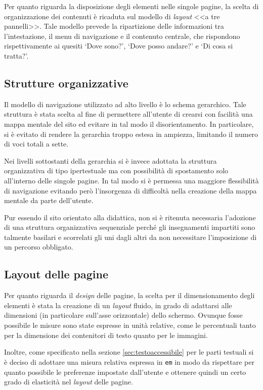 \documentclass[10pt,a4paper,onecolumn]{article}
\newcommand{\inglese}[1]{\foreignlanguage{english}{\itshape{}#1}}
\begin{document}
Per quanto riguarda la disposizione degli elementi nelle singole pagine, la scelta di organizzazione dei contenuti è ricaduta sul modello di \inglese{layout} <<a tre pannelli>>. Tale modello prevede la ripartizione delle informazioni tra l'intestazione, il menu di navigazione e il contenuto centrale, che rispondono rispettivamente ai quesiti `Dove sono?', `Dove posso andare?' e `Di cosa si tratta?'.

\subsection{Strutture organizzative}
Il modello di navigazione utilizzato ad alto livello è lo schema gerarchico. Tale struttura è stata scelta al fine di permettere all'utente di crearsi con facilità una mappa mentale del sito ed evitare in tal modo il disorientamento. In particolare, si è evitato di rendere la gerarchia troppo estesa in ampiezza, limitando il numero di voci totali a sette.

Nei livelli sottostanti della gerarchia si è invece adottata la struttura organizzativa di tipo ipertestuale ma con possibilità di spostamento solo all'interno delle singole pagine. In tal modo si è permessa una maggiore flessibilità di navigazione evitando però l'insorgenza di difficoltà nella creazione della mappa mentale da parte dell'utente.

Pur essendo il sito orientato alla didattica, non si è ritenuta necessaria l'adozione di una struttura organizzativa sequenziale perché gli insegnamenti impartiti sono talmente basilari e scorrelati gli uni dagli altri da non necessitare l'imposizione di un percorso obbligato.

\subsection{Layout delle pagine}
Per quanto riguarda il \inglese{design} delle pagine, la scelta per il dimensionamento degli elementi è stata la creazione di un \inglese{layout} fluido, in grado di adattarsi alle dimensioni (in particolare sull'asse orizzontale) dello schermo. Ovunque fosse possibile le misure sono state espresse in unità relative, come le percentuali tanto per la dimensione dei contenitori di testo quanto per le immagini.


Inoltre, come specificato nella sezione \ref{sec:testoaccessibile} per le parti testuali si è deciso di adottare una misura relativa espressa in \texttt{em} in modo da rispettare per quanto possibile le preferenze impostate dall'utente e ottenere quindi un certo grado di elasticità nel \inglese{layout} delle pagine.
\end{document}
